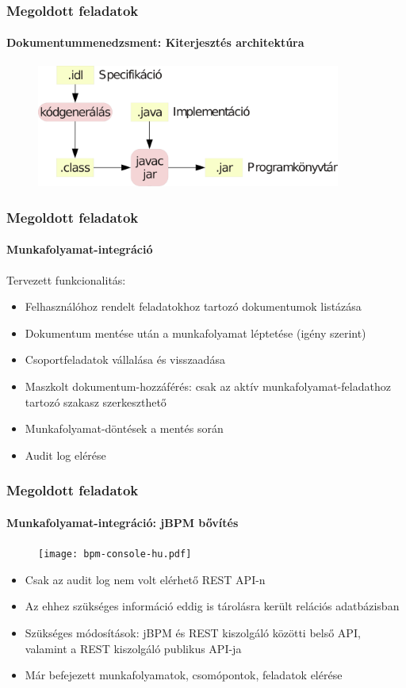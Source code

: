 \documentclass{beamer}
\begin{document}
\begin{frame}
\frametitle{Megoldott feladatok}
\framesubtitle{Dokumentummenedzsment: Kiterjesztés architektúra}

\begin{figure}[H]
\includegraphics[width=100mm,keepaspectratio]{uno-java-hu.pdf}
\end{figure}
\end{frame}

\begin{frame}
\frametitle{Megoldott feladatok}
\framesubtitle{Munkafolyamat-integráció}
Tervezett funkcionalitás:
\begin{itemize}
\item Felhasználóhoz rendelt feladatokhoz tartozó dokumentumok listázása
\item Dokumentum mentése után a munkafolyamat léptetése (igény szerint)
\item Csoportfeladatok vállalása és visszaadása
\item Maszkolt dokumentum-hozzáférés: csak az aktív munkafolyamat-feladathoz tartozó szakasz szerkeszthető
\item Munkafolyamat-döntések a mentés során
\item Audit log elérése
\end{itemize}
\end{frame}

\begin{frame}
\frametitle{Megoldott feladatok}
\framesubtitle{Munkafolyamat-integráció: jBPM bővítés}
\begin{figure}[H]
\texttt{[image: bpm-console-hu.pdf]}
\end{figure}
\begin{itemize}
\item Csak az audit log nem volt elérhető REST API-n
\item Az ehhez szükséges információ eddig is tárolásra került relációs adatbázisban
\item Szükséges módosítások: jBPM és REST kiszolgáló közötti belső API, valamint a REST kiszolgáló publikus API-ja
\item Már befejezett munkafolyamatok, csomópontok, feladatok elérése
\end{itemize}
\end{frame}
\end{document}
